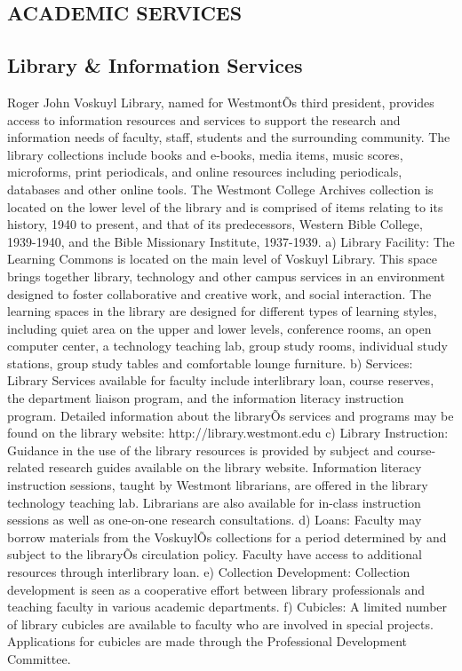 \documentclass[letterpaper, 11pt]{article}
\begin{document}
	\subsection{ACADEMIC SERVICES}
	\subsection{Library \& Information Services}
		Roger John Voskuyl Library, named for WestmontÕs third president, provides access to information resources and services to support the research and information needs of faculty, staff, students and the surrounding community.  The library collections include books and e-books, media items, music scores, microforms, print periodicals, and online resources including periodicals, databases and other online tools.  The Westmont College Archives collection is located on the lower level of the library and is comprised of items relating to its history, 1940 to present, and that of its predecessors, Western Bible College, 1939-1940, and the Bible Missionary Institute, 1937-1939.
		a) Library Facility:  The Learning Commons is located on the main level of Voskuyl Library.  This space brings together library, technology and other campus services in an environment designed to foster collaborative and creative work, and social interaction.  The learning spaces in the library are designed for different types of learning styles, including quiet area on the upper and lower levels, conference rooms, an open computer center, a technology teaching lab, group study rooms, individual study stations, group study tables and comfortable lounge furniture.
		b) Services:  Library Services available for faculty include interlibrary loan, course reserves, the department liaison program, and the information literacy instruction program.  Detailed information about the libraryÕs services and programs may be found on the library website: http://library.westmont.edu
		c) Library Instruction:  Guidance in the use of the library resources is provided by subject and course-related research guides available on the library website.  Information literacy instruction sessions, taught by Westmont librarians, are offered in the library technology teaching lab.  Librarians are also available for in-class instruction sessions as well as one-on-one research consultations.
		d) Loans:  Faculty may borrow materials from the VoskuylÕs collections for a period determined by and subject to the libraryÕs circulation policy.  Faculty have access to additional resources through interlibrary loan.
		e) Collection Development:  Collection development is seen as a cooperative effort between library professionals and teaching faculty in various academic departments.
		f) Cubicles:  A limited number of library cubicles are available to faculty who are involved in special projects.  Applications for cubicles are made through the Professional Development Committee.
\end{document}
